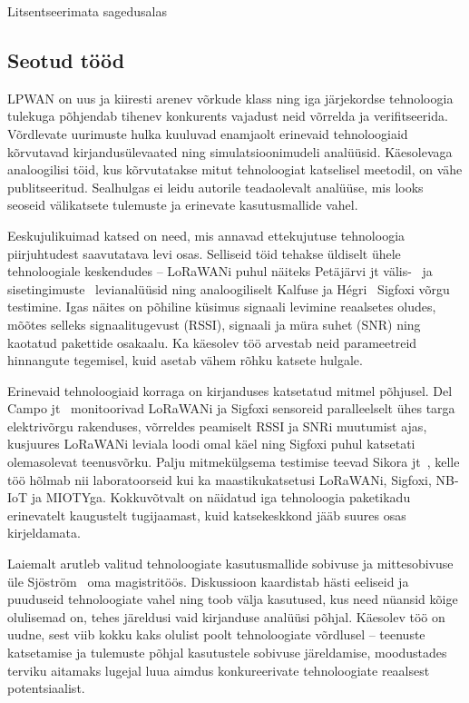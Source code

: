 \documentclass[12pt]{article}
\begin{document}
Litsentseerimata sagedusalas

\subsection{Seotud tööd}
LPWAN on uus ja kiiresti arenev võrkude klass ning iga järjekordse tehnoloogia tulekuga põhjendab tihenev konkurents vajadust neid võrrelda ja verifitseerida.
Võrdlevate uurimuste hulka kuuluvad enamjaolt erinevaid tehnoloogiaid kõrvutavad kirjandusülevaated ning simulatsioonimudeli analüüsid.
Käesolevaga analoogilisi töid, kus kõrvutatakse mitut tehnoloogiat katselisel meetodil, on vähe publitseeritud.
Sealhulgas ei leidu autorile teadaolevalt analüüse, mis looks seoseid välikatsete tulemuste ja erinevate kasutusmallide vahel.

Eeskujulikuimad katsed on need, mis annavad ettekujutuse tehnoloogia piirjuhtudest saavutatava levi osas.
Selliseid töid tehakse üldiselt ühele tehnoloogiale keskendudes -- LoRaWANi puhul näiteks Petäjärvi jt välis-~\cite{petajajarvi2015coverage} ja sisetingimuste~\cite{petajajarvi} levianalüüsid ning analoogiliselt Kalfuse ja Hégri~\cite{kalfus2016ultra} Sigfoxi võrgu testimine.
Igas näites on põhiline küsimus signaali levimine reaalsetes oludes, mõõtes selleks signaalitugevust (RSSI), signaali ja müra suhet (SNR) ning kaotatud pakettide osakaalu.
Ka käesolev töö arvestab neid parameetreid hinnangute tegemisel, kuid asetab vähem rõhku katsete hulgale.

Erinevaid tehnoloogiaid korraga on kirjanduses katsetatud mitmel põhjusel.
Del Campo jt~\cite{del2019hybrid} monitoorivad LoRaWANi ja Sigfoxi sensoreid paralleelselt ühes targa elektrivõrgu rakenduses, võrreldes peamiselt RSSI ja SNRi muutumist ajas, kusjuures LoRaWANi leviala loodi omal käel ning Sigfoxi puhul katsetati olemasolevat teenusvõrku.
Palju mitmekülgsema testimise teevad Sikora jt~\cite{sikora2019test}, kelle töö hõlmab nii laboratoorseid kui ka maastikukatsetusi LoRaWANi, Sigfoxi, NB-IoT ja MIOTYga.
Kokkuvõtvalt on näidatud iga tehnoloogia paketikadu erinevatelt kaugustelt tugijaamast, kuid katsekeskkond jääb suures osas kirjeldamata.

Laiemalt arutleb valitud tehnoloogiate kasutusmallide sobivuse ja mittesobivuse üle Sjöström~\cite{sjostrom2017unlicensed} oma magistritöös.
Diskussioon kaardistab hästi eeliseid ja puuduseid tehnoloogiate vahel ning toob välja kasutused, kus need nüansid kõige olulisemad on, tehes järeldusi vaid kirjanduse analüüsi põhjal.
Käesolev töö on uudne, sest viib kokku kaks olulist poolt tehnoloogiate võrdlusel -- teenuste katsetamise ja tulemuste põhjal kasutustele sobivuse järeldamise, moodustades terviku aitamaks lugejal luua aimdus konkureerivate tehnoloogiate reaalsest potentsiaalist.
\end{document}
